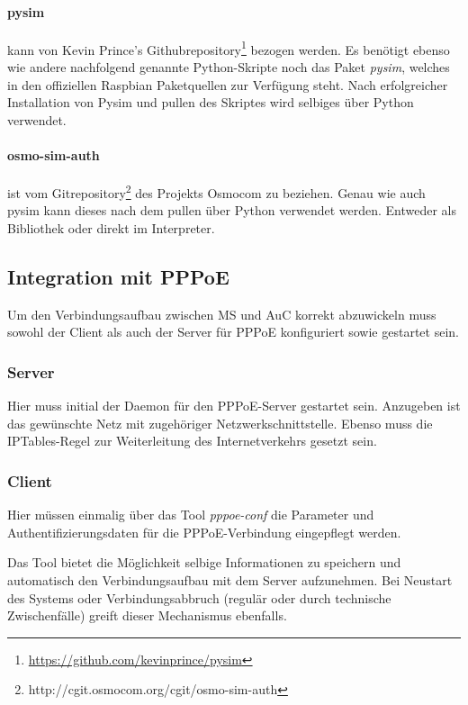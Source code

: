 			\paragraph{pysim} kann von Kevin Prince's Githubrepository\footnote{\url{https://github.com/kevinprince/pysim}} bezogen werden. Es benötigt ebenso
            wie andere nachfolgend genannte Python-Skripte noch das Paket \textit{pysim}, welches
            in den offiziellen Raspbian Paketquellen zur Verfügung steht. Nach erfolgreicher Installation
            von Pysim und pullen des Skriptes wird selbiges über Python verwendet.

            \paragraph{osmo-sim-auth} ist vom Gitrepository\footnote{\url{}http://cgit.osmocom.org/cgit/osmo-sim-auth} des Projekts Osmocom zu  beziehen. Genau wie auch pysim kann dieses nach dem pullen
            über Python verwendet werden. Entweder als Bibliothek oder direkt im Interpreter.

	\subsection{Integration mit PPPoE}
        Um den Verbindungsaufbau zwischen \ac{MS} und \ac{AuC} korrekt abzuwickeln muss sowohl der Client
        als auch der Server für \ac{PPPoE} konfiguriert sowie gestartet sein.

		 \subsubsection{Server}
         Hier muss initial der Daemon für den \ac{PPPoE}-Server gestartet sein. Anzugeben ist das gewünschte
         Netz mit zugehöriger Netzwerkschnittstelle. Ebenso muss die IPTables-Regel zur Weiterleitung
         des Internetverkehrs gesetzt sein.

         \subsubsection{Client}
         Hier müssen einmalig über das Tool \textit{pppoe-conf} die Parameter und Authentifizierungsdaten
         für die \ac{PPPoE}-Verbindung eingepflegt werden.

         Das Tool bietet die Möglichkeit selbige Informationen
         zu speichern und automatisch den Verbindungsaufbau mit dem Server aufzunehmen. Bei Neustart
         des Systems oder Verbindungsabbruch (regulär oder durch technische Zwischenfälle) greift dieser
         Mechanismus ebenfalls.
         
